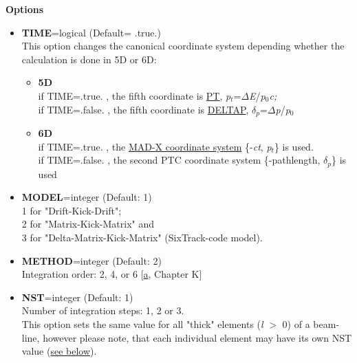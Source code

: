 {\bf Options} \\ 
\begin{itemize}

   \item {\bf TIME}=logical (Default= .true.) \\
     This option changes the canonical coordinate system depending
     whether the calculation is done in 5D or 6D: 
     \begin{itemize}
       \item {\bf 5D} \\ 
       if TIME=.true. , the fifth coordinate is
       \href{../Introduction/tables.html#canon}{PT},
       \textit{p$_t$}=$\Delta$\textit{E}/\textit{p}$_0$\textit{c;} \\ 
       if TIME=.false. , the fifth coordinate is
       \href{../Introduction/tables.html#canon}{DELTAP},
       \textit{$\delta$}$_\textit{p}$=$\Delta$\textit{p}/\textit{p}$_0$

       \item {\bf 6D} \\ 
       if TIME=.true. , the \href{../Introduction/tables.html#canon}{   MAD-X
         coordinate system} \{-\textit{ct}, \textit{p$_t$}\} is used. \\ 
       if TIME=.false. , the second PTC coordinate system \{-pathlength,
       \textit{$\delta$}$_\textit{p}$\} is used \\       
     \end{itemize}
     
   
   \item {\bf MODEL}=integer (Default: 1) \\
     1 for "Drift-Kick-Drift"; \\ 
     2 for "Matrix-Kick-Matrix" and \\ 
     3 for "Delta-Matrix-Kick-Matrix" (SixTrack-code model).

   \item {\bf METHOD}=integer (Default: 2) \\
     Integration order: 2, 4, or 6 [\hyperlink{E.Forest}{a}, Chapter K] 

   \item {\bf NST}=integer (Default: 1) \\
     Number of integration steps: 1, 2 or 3. \\
     This option sets the same value  for all "thick" elements
     (\textit{l} $>$ 0) of a beam-line, however please note, that each
     individual element may have its own NST value
     (\hyperlink{individual}{see below}). 


\end{itemize}
